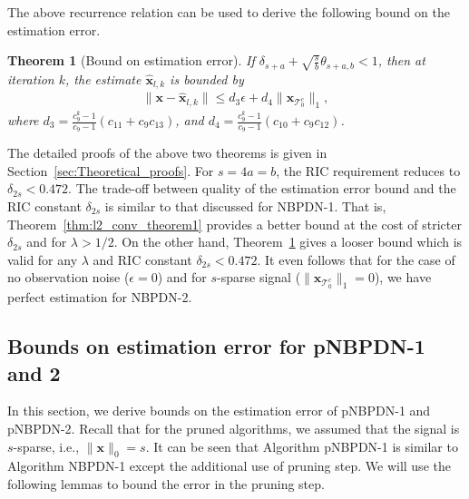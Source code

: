 \documentclass[journal]{IEEEtran}
\newcommand{\mbx}{\mathbf{x}}
\newcommand{\T}{\mathcal{T}}
\newtheorem{theorem}{Theorem}
\begin{document}
The above recurrence relation can be used to derive the following bound on the estimation error.
\begin{theorem}[Bound on estimation error]
\label{thm:l2_convergence_theorem2}
If $\delta_{s+a}+\sqrt{\frac{s}{b}}\theta_{s+a,b} < 1$, then at iteration $k$, the estimate $\hat{\mbx}_{l,k}$ is bounded by
\begin{eqnarray*}
\|\mbx-\hat{\mbx}_{l,k}\| \leq d_3 \epsilon + d_4 \|\mbx_{\T_0^c}\|_1,
\end{eqnarray*}
where $d_3 = \frac{c_9^k-1}{c_9-1}(c_{11}+c_9 c_{13})$, and $d_4 = \frac{c_9^k-1}{c_9-1}(c_{10}+c_9 c_{12})$.
\end{theorem}
The detailed proofs of the above two theorems is given in Section~\ref{sec:Theoretical_proofs}. For $s=4a=b$, the RIC requirement reduces to $\delta_{2s} < 0.472$. The trade-off between quality of the estimation error bound and the RIC constant $\delta_{2s}$ is similar to that discussed for NBPDN-1. That is, Theorem~\ref{thm:l2_conv_theorem1} provides a better bound at the cost of stricter $\delta_{2s}$ and for $\lambda > 1/2$. On the other hand, Theorem~\ref{thm:l2_convergence_theorem2} gives a looser bound which is valid for any $\lambda$ and RIC constant $\delta_{2s} < 0.472$. It even follows that for the case of no observation noise ($\epsilon=0$) and for $s$-sparse signal ($\|\mbx_{\T_0^c}\|_1=0$), we have perfect estimation for NBPDN-2.

\subsection{Bounds on estimation error for pNBPDN-1 and 2}
In this section, we derive bounds on the estimation error of pNBPDN-1 and pNBPDN-2. Recall that for the pruned algorithms, we assumed that the signal is $s$-sparse, i.e., $\| \mbx \|_0 =s$. It can be seen that Algorithm pNBPDN-1 is similar to Algorithm NBPDN-1 except the additional use of pruning step. We will use the following lemmas to bound the error in the pruning step.
\end{document}
